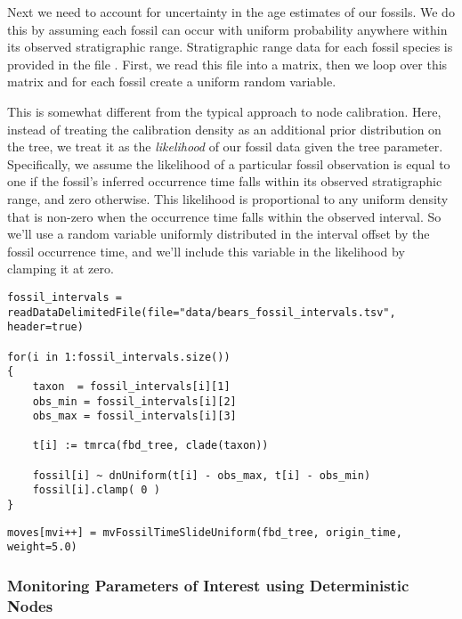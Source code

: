 Next we need to account for uncertainty in the age estimates of our fossils.
We do this by assuming each fossil can occur with uniform probability anywhere within its observed stratigraphic range.
Stratigraphic range data for each fossil species is provided in the file .
First, we read this file into a matrix, then we loop over this matrix and for each fossil create a uniform random variable.

This is somewhat different from the typical approach to node calibration.
Here, instead of treating the calibration density as an additional prior distribution on the tree, we treat it as the \textit{likelihood} of our fossil data given the tree parameter.
Specifically, we assume the likelihood of a particular fossil observation is equal to one if the fossil's inferred occurrence time falls within its observed stratigraphic range, and zero otherwise.
This likelihood is proportional to any uniform density that is non-zero when the occurrence time falls within the observed interval.
So we'll use a random variable uniformly distributed in the interval offset by the fossil occurrence time, and we'll include this variable in the likelihood by clamping it at zero.

{\tt \begin{snugshade*}
\begin{lstlisting}
fossil_intervals = readDataDelimitedFile(file="data/bears_fossil_intervals.tsv", header=true)

for(i in 1:fossil_intervals.size())
{
    taxon  = fossil_intervals[i][1]
    obs_min = fossil_intervals[i][2]
    obs_max = fossil_intervals[i][3]
    
    t[i] := tmrca(fbd_tree, clade(taxon))
        
    fossil[i] ~ dnUniform(t[i] - obs_max, t[i] - obs_min)
    fossil[i].clamp( 0 )
}
\end{lstlisting}
\end{snugshade*}}


{\tt \begin{snugshade*}
\begin{lstlisting}
moves[mvi++] = mvFossilTimeSlideUniform(fbd_tree, origin_time, weight=5.0)
\end{lstlisting}
\end{snugshade*}}

\subsubsection{Monitoring Parameters of Interest using Deterministic Nodes}\label{subsub:RB-FBD-DetNodes}


